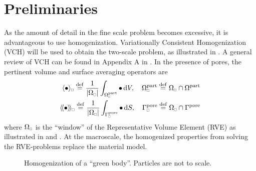 \documentclass[MikaelDissertation.tex]{subfiles}
\begin{document}
\section{Preliminaries}

As the amount of detail in the fine scale problem becomes excessive, it is advantageous to use homogenization.
Variationally Consistent Homogenization (VCH) will be used to obtain the two-scale problem, as illustrated in .
A general review of VCH can be found in Appendix A in .
In the presence of pores, the pertinent volume and surface averaging operators are
\begin{align}
 \homgen{\bullet} \defeq \frac{1}{\volume} \int_{\Omega_\rve^\particle} \bullet \dif V,\quad \Omega_\rve^\particle \defeq \Omega_\rve \cap \Omega^\particle
\\
 \shomgen{\bullet} \defeq \frac{1}{\volume} \int_{\Gamma^\pore_\rve} \bullet \dif S,\quad \Gamma^\pore_\rve \defeq \Omega_\rve \cap \Gamma^\pore
\end{align}
where $\Omega_\rve$ is the ``window'' of the Representative Volume Element (RVE) as illustrated in  and .
At the macroscale, the homogenized properties from solving the RVE-problems replace the material model.

\begin{figure}[htpb!]
\centering
{}
\caption{Homogenization of a ``green body''. Particles are not to scale.}
\label{fig:homogenization}
\end{figure}
\end{document}
